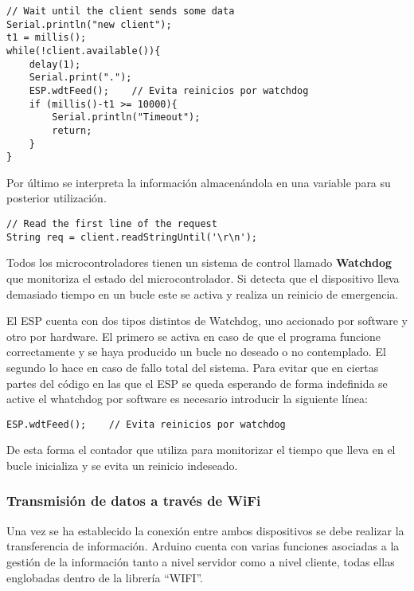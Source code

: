 \begin{lstlisting}[label=algoritmo:ESP_Server_handler_2,style = STM-code,frame=single,caption=Gestión de clientes y peticiones en Arduino]
// Wait until the client sends some data
Serial.println("new client");
t1 = millis();
while(!client.available()){
	delay(1);
	Serial.print(".");
	ESP.wdtFeed();    // Evita reinicios por watchdog
	if (millis()-t1 >= 10000){
		Serial.println("Timeout");
		return;
	}
}
\end{lstlisting}

Por último se interpreta la información almacenándola en una variable para su posterior utilización.

\begin{lstlisting}[label=algoritmo:ESP_Server_handler_2,style = STM-code,frame=single,caption=Gestión de clientes y peticiones en Arduino]
// Read the first line of the request
String req = client.readStringUntil('\r\n');
\end{lstlisting}

Todos los microcontroladores tienen un sistema de control llamado \textbf{Watchdog} que monitoriza el estado del microcontrolador. Si detecta que el dispositivo lleva demasiado tiempo en un bucle este se activa y realiza un reinicio de emergencia. 

El ESP cuenta con dos tipos distintos de Watchdog, uno accionado por software y otro por hardware. El primero se activa en caso de que el programa funcione correctamente y se haya producido un bucle no deseado o no contemplado. El segundo lo hace en caso de fallo total del sistema. Para evitar que en ciertas partes del código en las que el ESP se queda esperando de forma indefinida se active el whatchdog por software es necesario introducir la siguiente línea:
\begin{lstlisting}[label=algoritmo:ESP_Server_wdt,style = STM-code,frame=single,caption=Reinicios por \textit{watchdog}]
ESP.wdtFeed();    // Evita reinicios por watchdog
\end{lstlisting}
De esta forma el contador que utiliza para monitorizar el tiempo que lleva en el bucle inicializa y se evita un reinicio indeseado.

\subsubsection{Transmisión de datos a través de WiFi\label{sec:Software_Arduino_Com_WiFi}}

Una vez se ha establecido la conexión entre ambos dispositivos se debe realizar la transferencia de información. Arduino cuenta con varias funciones asociadas a la gestión de la información tanto a nivel servidor como a nivel cliente, todas ellas englobadas dentro de la librería ``WIFI''.


